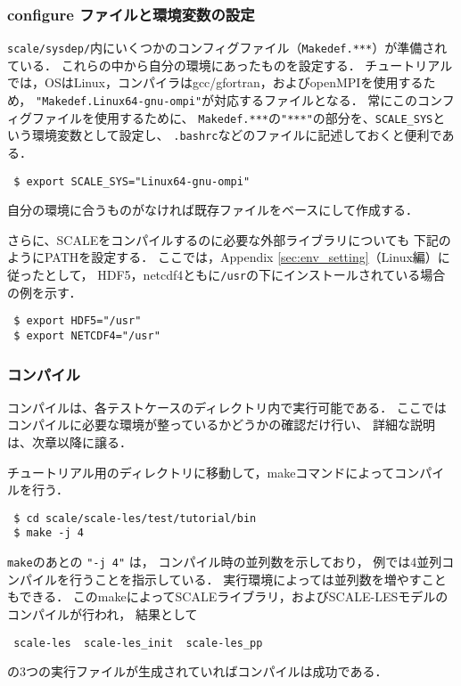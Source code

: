 \subsubsection{configure ファイルと環境変数の設定}

\verb|scale/sysdep/|内にいくつかのコンフィグファイル（\verb|Makedef.***|）が準備されている．
これらの中から自分の環境にあったものを設定する．
チュートリアルでは，OSはLinux，コンパイラはgcc/gfortran，およびopenMPIを使用するため，
\verb|"Makedef.Linux64-gnu-ompi"|が対応するファイルとなる．
常にこのコンフィグファイルを使用するために、
\verb|Makedef.***|の\verb|"***"|の部分を、\verb|SCALE_SYS|という環境変数として設定し、
\verb|.bashrc|などのファイルに記述しておくと便利である．
\begin{verbatim}
 $ export SCALE_SYS="Linux64-gnu-ompi"
\end{verbatim}
自分の環境に合うものがなければ既存ファイルをベースにして作成する．

さらに、SCALEをコンパイルするのに必要な外部ライブラリについても
下記のようにPATHを設定する．
ここでは，Appendix \ref{sec:env_setting}（Linux編）に従ったとして，
HDF5，netcdf4ともに\verb|/usr|の下にインストールされている場合の例を示す．
\begin{verbatim}
 $ export HDF5="/usr"
 $ export NETCDF4="/usr"
\end{verbatim}


\subsubsection{コンパイル}
コンパイルは、各テストケースのディレクトリ内で実行可能である．
ここではコンパイルに必要な環境が整っているかどうかの確認だけ行い、
詳細な説明は、次章以降に譲る．

チュートリアル用のディレクトリに移動して，makeコマンドによってコンパイルを行う．
\begin{verbatim}
 $ cd scale/scale-les/test/tutorial/bin
 $ make -j 4
\end{verbatim}
\verb|make|のあとの \verb|"-j 4"| は，
コンパイル時の並列数を示しており，
例では4並列コンパイルを行うことを指示している．
実行環境によっては並列数を増やすこともできる．
このmakeによってSCALEライブラリ，およびSCALE-LESモデルのコンパイルが行われ，
結果として
\begin{verbatim}
 scale-les  scale-les_init  scale-les_pp
\end{verbatim}
の3つの実行ファイルが生成されていればコンパイルは成功である．\\

